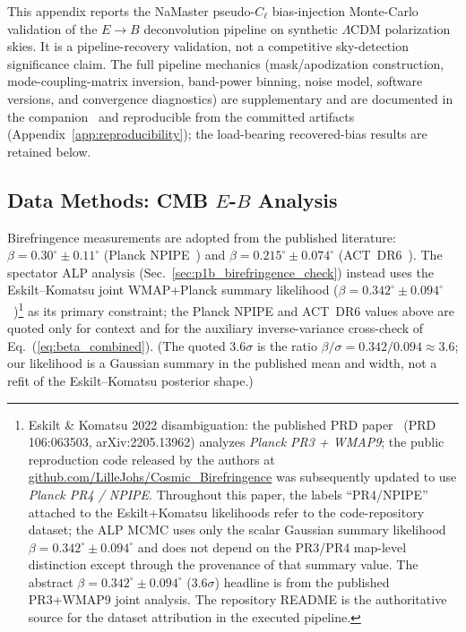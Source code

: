 \documentclass[aps,prd,twocolumn,superscriptaddress,showpacs,preprintnumbers,nofootinbib,longbibliography,floatfix]{revtex4-2}
\begin{document}
This appendix reports the NaMaster pseudo-$C_\ell$ bias-injection Monte-Carlo
validation of the $E\!\to\!B$ deconvolution pipeline on synthetic
$\Lambda$CDM polarization skies. It is a pipeline-recovery validation, not a
competitive sky-detection significance claim. The full pipeline mechanics
(mask/apodization construction, mode-coupling-matrix inversion, band-power
binning, noise model, software versions, and convergence diagnostics) are
supplementary and are documented in the companion~\cite{Golden2026P1B} and
reproducible from the committed artifacts~\cite{BigBounceRepro}
(Appendix~\ref{app:reproducibility});
the load-bearing recovered-bias results are retained below.

\subsection{Data Methods: CMB $E$-$B$ Analysis}\label{sec:p1b_data_cmb}

Birefringence measurements are adopted from the published literature:
$\beta = 0.30^\circ\pm 0.11^\circ$ (Planck NPIPE~\cite{DiegoPalazuelos2022}) and
$\beta = 0.215^\circ\pm 0.074^\circ$ (ACT~DR6~\cite{DiegoPalazuelos2025}).
The spectator ALP analysis (Sec.~\ref{sec:p1b_birefringence_check}) instead uses
the Eskilt--Komatsu joint WMAP+Planck summary likelihood
($\beta = 0.342^\circ\pm 0.094^\circ$~\cite{Eskilt2022})\footnote{\label{fn:eskilt_pr3_pr4}Eskilt
\& Komatsu 2022 disambiguation: the published PRD
paper~\cite{Eskilt2022} (PRD 106:063503, arXiv:2205.13962) analyzes
\emph{Planck PR3 + WMAP9}; the public reproduction code released by the
authors at \href{https://github.com/LilleJohs/Cosmic_Birefringence}{github.com/LilleJohs/Cosmic\_Birefringence}
was subsequently updated to use \emph{Planck PR4 / NPIPE}. Throughout
this paper, the labels ``PR4/NPIPE'' attached to the Eskilt+Komatsu
likelihoods refer to the code-repository dataset; the ALP MCMC uses only
the scalar Gaussian summary likelihood $\beta=0.342^\circ\pm 0.094^\circ$
and does not depend on the PR3/PR4 map-level distinction except through
the provenance of that summary value. The abstract
$\beta=0.342^\circ\pm 0.094^\circ$
($3.6\sigma$) headline is from the published PR3+WMAP9 joint analysis.
The repository README is the authoritative source for the dataset
attribution in the executed pipeline.} as its primary
constraint; the Planck NPIPE and ACT~DR6 values above are quoted only for
context and for the auxiliary inverse-variance cross-check of
Eq.~(\ref{eq:beta_combined}). (The quoted $3.6\sigma$ is the ratio
$\beta/\sigma = 0.342/0.094 \approx 3.6$; our likelihood is a Gaussian
summary in the published mean and width, not a refit of the
Eskilt--Komatsu posterior shape.)
\end{document}
